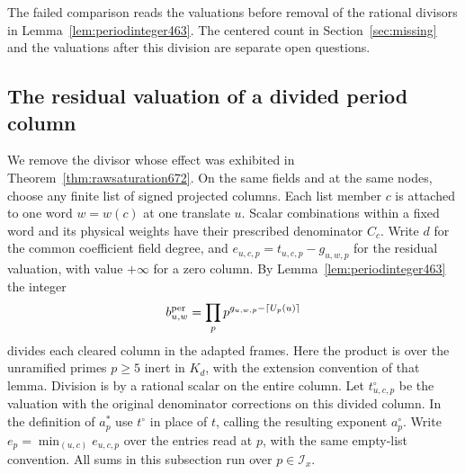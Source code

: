 \documentclass[a4paper,11pt]{article}
\theoremstyle{definition}
\theoremstyle{remark}
\numberwithin{equation}{section}
\begin{document}
The failed comparison reads the valuations before removal of
the rational divisors in Lemma~\ref{lem:periodinteger463}. The
centered count in Section~\ref{sec:missing} and the valuations
after this division are separate open questions.


\subsection{The residual valuation of a divided period column}
\label{sec:dividedprimecomparison673}

We remove the divisor whose effect was exhibited in
Theorem~\ref{thm:rawsaturation672}. On the same fields and at
the same nodes, choose any finite list of signed projected columns.
Each list member \(c\) is attached to one word \(w=w(c)\) at
one translate \(u\). Scalar combinations within a fixed word
and its physical weights have their prescribed denominator
\(C_c\). Write \(d\) for the common coefficient field degree,
and \(e_{u,c,p}=t_{u,c,p}-g_{u,w,p}\) for the residual valuation,
with value \(+\infty\) for a zero column. By
Lemma~\ref{lem:periodinteger463} the integer
\[
 b^{\rm per}_{u,w}=\prod_{p}p^{g_{u,w,p}-\lceil U_p(u)\rceil}
\]
divides each cleared column in the adapted frames. Here the
product is over the unramified primes \(p\ge5\) inert in \(K_d\),
with the extension convention of that lemma. Division is by a
rational scalar on the entire column. Let \(t^\circ_{u,c,p}\)
be the valuation with the original denominator corrections on
this divided column. In the definition of \(a_p^*\) use
\(t^\circ\) in place of \(t\), calling the resulting exponent
\(a_p^\circ\). Write \(e_p=\min_{(u,c)}e_{u,c,p}\) over the
entries read at \(p\), with the same empty-list convention.
All sums in this subsection run over \(p\in\mathcal I_x\).
\end{document}
